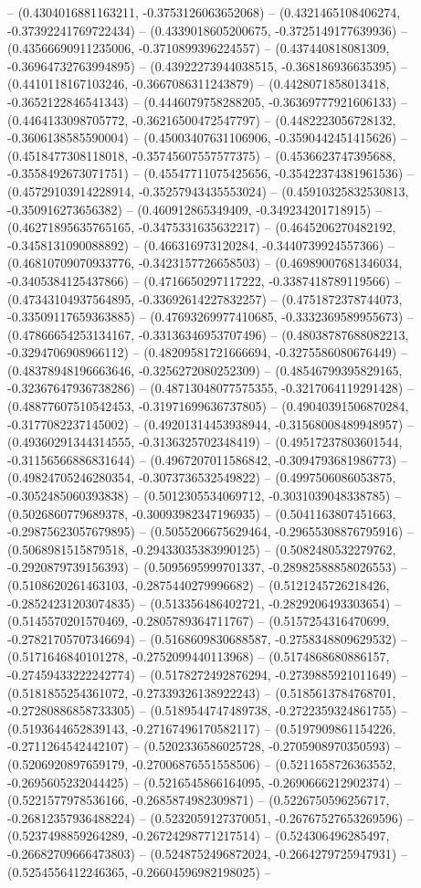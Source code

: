 -- (0.4304016881163211, -0.3753126063652068) -- (0.4321465108406274, -0.37392241769722434) -- (0.4339018605200675, -0.3725149177639936) -- (0.43566690911235006, -0.3710899396224557) -- (0.437440818081309, -0.36964732763994895) -- (0.43922273944038515, -0.368186936635395) -- (0.4410118167103246, -0.3667086311243879) -- (0.4428071858013418, -0.3652122846541343) -- (0.4446079758288205, -0.36369777921606133) -- (0.4464133098705772, -0.36216500472547797) -- (0.4482223056728132, -0.3606138585590004) -- (0.45003407631106906, -0.3590442451415626) -- (0.4518477308118018, -0.35745607557577375) -- (0.4536623747395688, -0.3558492673071751) -- (0.45547711075425656, -0.35422374381961536) -- (0.45729103914228914, -0.35257943435553024) -- (0.45910325832530813, -0.350916273656382) -- (0.460912865349409, -0.349234201718915) -- (0.46271895635765165, -0.3475331635632217) -- (0.4645206270482192, -0.3458131090088892) -- (0.466316973120284, -0.3440739924557366) -- (0.46810709070933776, -0.3423157726658503) -- (0.46989007681346034, -0.3405384125437866) -- (0.4716650297117222, -0.3387418789119566) -- (0.47343104937564895, -0.33692614227832257) -- (0.4751872378744073, -0.33509117659363885) -- (0.47693269977410685, -0.3332369589955673) -- (0.47866654253134167, -0.33136346953707496) -- (0.48038787688082213, -0.3294706908966112) -- (0.48209581721666694, -0.3275586080676449) -- (0.48378948196663646, -0.3256272080252309) -- (0.48546799395829165, -0.32367647936738286) -- (0.48713048077575355, -0.3217064119291428) -- (0.48877607510542453, -0.31971699636737805) -- (0.49040391506870284, -0.3177082237145002) -- (0.49201314453938944, -0.31568008489948957) -- (0.49360291344314555, -0.3136325702348419) -- (0.49517237803601544, -0.31156566886831644) -- (0.4967207011586842, -0.3094793681986773) -- (0.49824705246280354, -0.3073736532549822) -- (0.4997506086053875, -0.3052485060393838) -- (0.5012305534069712, -0.3031039048338785) -- (0.5026860779689378, -0.30093982347196935) -- (0.5041163807451663, -0.29875623057679895) -- (0.5055206675629464, -0.29655308876795916) -- (0.5068981515879518, -0.29433035383990125) -- (0.5082480532279762, -0.2920879739156393) -- (0.5095695999701337, -0.28982588858026553) -- (0.5108620261463103, -0.2875440279996682) -- (0.5121245726218426, -0.28524231203074835) -- (0.513356486402721, -0.2829206493303654) -- (0.5145570201570469, -0.2805789364711767) -- (0.5157254316470699, -0.27821705707346694) -- (0.5168609830688587, -0.2758348809629532) -- (0.5171646840101278, -0.2752099440113968) -- (0.5174868680886157, -0.27459433222242774) -- (0.5178272492876294, -0.2739885921011649) -- (0.5181855254361072, -0.27339326138922243) -- (0.5185613784768701, -0.27280886858733305) -- (0.5189544747489738, -0.2722359324861755) -- (0.5193644652839143, -0.27167496170582117) -- (0.5197909861154226, -0.2711264542442107) -- (0.5202336586025728, -0.2705908970350593) -- (0.5206920897659179, -0.27006876551558506) -- (0.5211658726363552, -0.2695605232044425) -- (0.5216545866164095, -0.2690666212902374) -- (0.5221577978536166, -0.2685874982309871) -- (0.5226750596256717, -0.26812357936488224) -- (0.5232059127370051, -0.26767527653269596) -- (0.5237498859264289, -0.26724298771217514) -- (0.524306496285497, -0.26682709666473803) -- (0.5248752496872024, -0.2664279725947931) -- (0.5254556412246365, -0.26604596982198025) -- 